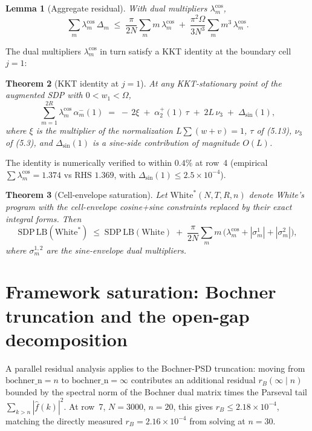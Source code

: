\documentclass[11pt]{article}
\theoremstyle{plain}
\newtheorem{theorem}{Theorem}
\newtheorem{lemma}[theorem]{Lemma}
\theoremstyle{definition}
\begin{document}
\begin{lemma}[Aggregate residual]\label{lem:aggregate}
With dual multipliers $\lambda_m^{\cos}$,
\[
\sum_m \lambda_m^{\cos}\, \Delta_m \;\le\;
\frac{\pi}{2N} \sum_m m\, \lambda_m^{\cos}
\;+\;
\frac{\pi^2 \Omega}{3 N^3} \sum_m m^3\, \lambda_m^{\cos}.
\]
\end{lemma}

The dual multipliers $\lambda_m^{\cos}$ in turn satisfy a KKT identity
at the boundary cell $j = 1$:

\begin{theorem}[KKT identity at $j = 1$]\label{thm:kkt}
At any KKT-stationary point of the augmented SDP with $0 < w_1 <
\Omega$,
\[
\sum_{m=1}^{2R} \lambda_m^{\cos}\, \alpha_m^-(1)
\;=\;
-\,2\xi \;+\; \alpha_2^+(1)\, \tau \;+\; 2L\, \nu_3
\;+\; \Delta_{\sin}(1),
\]
where $\xi$ is the multiplier of the normalization
$L \sum (w + v) = 1$, $\tau$ of (5.13), $\nu_3$ of (5.3), and
$\Delta_{\sin}(1)$ is a sine-side contribution of magnitude $O(L)$.
\end{theorem}

The identity is numerically verified to within $0.4\%$ at row~4
(empirical $\sum \lambda_m^{\cos} = 1.374$ vs RHS $1.369$, with
$\Delta_{\sin}(1) \le 2.5 \times 10^{-4}$).

\begin{theorem}[Cell-envelope saturation]\label{thm:cell-env}
Let $\mathrm{White}^*(N, T, R, n)$ denote White's program with the
cell-envelope cosine+sine constraints replaced by their exact integral
forms. Then
\[
\mathrm{SDP\,LB}(\mathrm{White}^*) \;\le\;
\mathrm{SDP\,LB}(\mathrm{White}) \;+\;
\frac{\pi}{2N} \sum_m m\,
\bigl(\lambda_m^{\cos} + |\sigma_m^1| + |\sigma_m^2|\bigr),
\]
where $\sigma_m^{1,2}$ are the sine-envelope dual multipliers.
\end{theorem}

\section{Framework saturation: Bochner truncation
and the open-gap decomposition}\label{sec:saturation}

A parallel residual analysis applies to the Bochner-PSD truncation:
moving from $\mathrm{bochner\_n} = n$ to $\mathrm{bochner\_n} = \infty$
contributes an additional residual $r_B(\infty \mid n)$ bounded by the
spectral norm of the Bochner dual matrix times the Parseval tail
$\sum_{k > n} |\hat f(k)|^2$. At row~7, $N = 3000$, $n = 20$, this
gives $r_B \le 2.18 \times 10^{-4}$, matching the directly measured
$r_B = 2.16 \times 10^{-4}$ from solving at $n = 30$.
\end{document}
